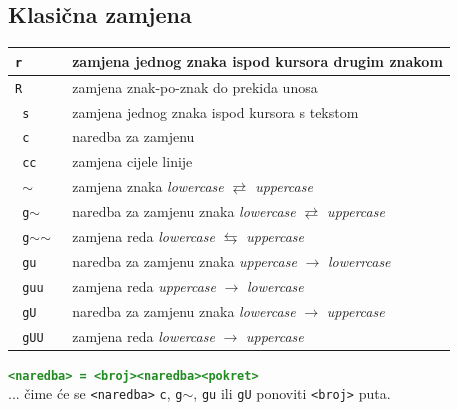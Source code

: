 \documentclass[10pt]{article}
\begin{document}
    \subsection*{\color{ForestGreen} Klasična zamjena}
    \begin{tabular}{|>{\tt}p{9.00cm}|>{}p{15.50cm}|}
        \hline
        r                   & zamjena jednog znaka ispod kursora drugim znakom                                              \\ \hline
        R                   & zamjena znak-po-znak do prekida unosa                                                         \\ \hline                            
        s                   & zamjena jednog znaka ispod kursora s tekstom                                                  \\ \hline \hline
        c                   & naredba za zamjenu                                                                            \\ \hline
        cc                  & zamjena cijele linije                                                                         \\ \hline \hline
        $\sim$              & zamjena znaka \textit{lowercase} $\rightleftarrows$ \textit{uppercase}                        \\ \hline
        g$\sim$             & naredba za zamjenu znaka \textit{lowercase} $\rightleftarrows$ \textit{uppercase}             \\ \hline
        g$\sim$$\sim$       & zamjena reda \textit{lowercase} $\leftrightarrows$ \textit{uppercase}                         \\ \hline \hline
        gu                  & naredba za zamjenu znaka \textit{uppercase} $\rightarrow$ \textit{lowerrcase}                 \\ \hline
        guu                 & zamjena reda \textit{uppercase} $\rightarrow$ \textit{lowercase}                              \\ \hline \hline
        gU                  & naredba za zamjenu znaka \textit{lowercase} $\rightarrow$ \textit{uppercase}                  \\ \hline
        gUU                 & zamjena reda \textit{lowercase} $\rightarrow$ \textit{uppercase}                              \\ \hline
    \end{tabular}
    \begin{center}
        \large
        \textcolor{ForestGreen}{\texttt{\textbf{<naredba> = <broj><naredba><pokret>}}}
        \\
        ... čime će se \texttt{<naredba>} \texttt{c}, \texttt{g$\sim$}, \texttt{gu} ili \texttt{gU} ponoviti \texttt{<broj>} puta. 
    \end{center}
\end{document}
